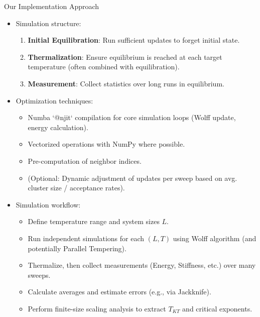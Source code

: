 \documentclass[11pt,aspectratio=169]{beamer}
\begin{document}
\begin{frame}{Our Implementation Approach}
    \begin{itemize}
        \item Simulation structure:
        \begin{enumerate}
            \item \textbf{Initial Equilibration}: Run sufficient updates to forget initial state.
            \item \textbf{Thermalization}: Ensure equilibrium is reached at each target temperature (often combined with equilibration).
            \item \textbf{Measurement}: Collect statistics over long runs in equilibrium.
        \end{enumerate}
        \pause
        \item Optimization techniques:
        \begin{itemize}
            \item Numba `@njit` compilation for core simulation loops (Wolff update, energy calculation).
            \item Vectorized operations with NumPy where possible.
            \item Pre-computation of neighbor indices.
            \item (Optional: Dynamic adjustment of updates per sweep based on avg. cluster size / acceptance rates).
        \end{itemize}
        \pause
        \item Simulation workflow:
        \begin{itemize}
            \item Define temperature range and system sizes $L$.
            \item Run independent simulations for each $(L, T)$ using Wolff algorithm (and potentially Parallel Tempering).
            \item Thermalize, then collect measurements (Energy, Stiffness, etc.) over many sweeps.
            \item Calculate averages and estimate errors (e.g., via Jackknife).
            \item Perform finite-size scaling analysis to extract $T_{KT}$ and critical exponents.
        \end{itemize}
    \end{itemize}
\end{frame}
\end{document}
